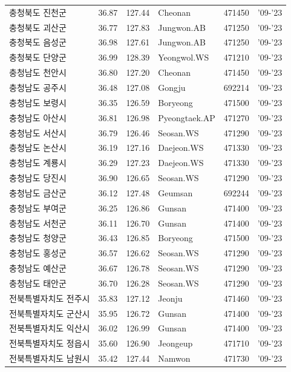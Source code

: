 \begin{longtable}{lcclcc}
  충청북도 진천군 & 36.87 & 127.44 & Cheonan & 471450 & '09-'23 \\
  충청북도 괴산군 & 36.77 & 127.83 & Jungwon.AB & 471250 & '09-'23 \\
  충청북도 음성군 & 36.98 & 127.61 & Jungwon.AB & 471250 & '09-'23 \\
  충청북도 단양군 & 36.99 & 128.39 & Yeongwol.WS & 471210 & '09-'23 \\
  충청남도 천안시 & 36.80 & 127.20 & Cheonan & 471450 & '09-'23 \\
  충청남도 공주시 & 36.48 & 127.08 & Gongju & 692214 & '09-'23 \\
  충청남도 보령시 & 36.35 & 126.59 & Boryeong & 471500 & '09-'23 \\
  충청남도 아산시 & 36.81 & 126.98 & Pyeongtaek.AP & 471270 & '09-'23 \\
  충청남도 서산시 & 36.79 & 126.46 & Seosan.WS & 471290 & '09-'23 \\
  충청남도 논산시 & 36.19 & 127.16 & Daejeon.WS & 471330 & '09-'23 \\
  충청남도 계룡시 & 36.29 & 127.23 & Daejeon.WS & 471330 & '09-'23 \\
  충청남도 당진시 & 36.90 & 126.65 & Seosan.WS & 471290 & '09-'23 \\
  충청남도 금산군 & 36.12 & 127.48 & Geumsan & 692244 & '09-'23 \\
  충청남도 부여군 & 36.25 & 126.86 & Gunsan & 471400 & '09-'23 \\
  충청남도 서천군 & 36.11 & 126.70 & Gunsan & 471400 & '09-'23 \\
  충청남도 청양군 & 36.43 & 126.85 & Boryeong & 471500 & '09-'23 \\
  충청남도 홍성군 & 36.57 & 126.62 & Seosan.WS & 471290 & '09-'23 \\
  충청남도 예산군 & 36.67 & 126.78 & Seosan.WS & 471290 & '09-'23 \\
  충청남도 태안군 & 36.70 & 126.28 & Seosan.WS & 471290 & '09-'23 \\
  전북특별자치도 전주시 & 35.83 & 127.12 & Jeonju & 471460 & '09-'23 \\
  전북특별자치도 군산시 & 35.95 & 126.72 & Gunsan & 471400 & '09-'23 \\
  전북특별자치도 익산시 & 36.02 & 126.99 & Gunsan & 471400 & '09-'23 \\
  전북특별자치도 정읍시 & 35.60 & 126.90 & Jeongeup & 471710 & '09-'23 \\
  전북특별자치도 남원시 & 35.42 & 127.44 & Namwon & 471730 & '09-'23 \\

\end{longtable}

